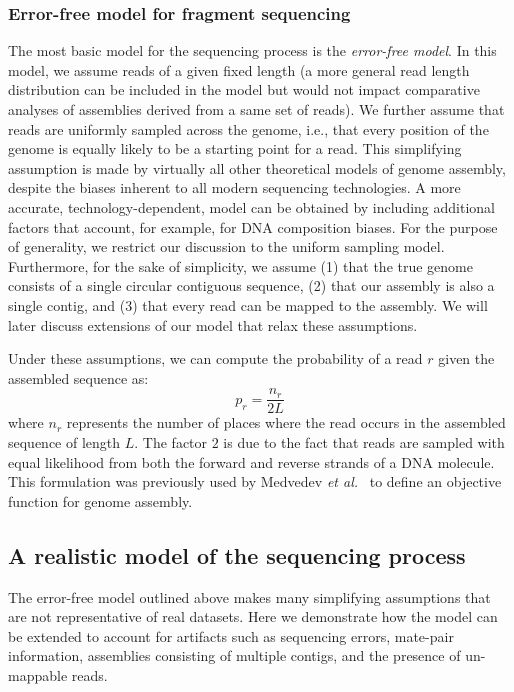 \documentclass[12pt,\mydriver]{thesis}
\begin{document}
\subsubsection{Error-free model for fragment sequencing}
\label{error_free_model}
The most basic model for the sequencing process is the
\emph{error-free model}. In this model, we assume reads of a given
fixed length (a more general read length distribution can be included
in the model but would not impact comparative analyses of assemblies
derived from a same set of reads). We further assume that reads are
uniformly sampled across the genome, i.e., that every position of the
genome is equally likely to be a starting point for a read. This
simplifying assumption is made by virtually all other theoretical
models of genome assembly, despite the biases inherent to all modern
sequencing technologies.  A more accurate, technology-dependent, model
can be obtained by including additional factors that account, for
example, for DNA composition biases.  For the purpose of generality,
we restrict our discussion to the uniform sampling model.
Furthermore, for the sake of simplicity, we assume (1) that the true
genome consists of a single circular contiguous sequence, (2) that our
assembly is also a single contig, and (3) that every read can be
mapped to the assembly.  We will later discuss extensions of our model
that relax these assumptions.

Under these assumptions, we can compute the probability of a
read $r$ given the assembled sequence as:
\begin{equation}
  \label{error_free_probability}
  p_r = \frac{n_r}{2L}
\end{equation}
where $n_r$ represents the number of places where the read occurs in
the assembled sequence of length $L$.  The factor $2$ is due to the
fact that reads are sampled with equal likelihood from both the
forward and reverse strands of a DNA molecule.  This formulation was
previously used by Medvedev \emph{et al.}~\cite{medvedev2009maximum}
to define an objective function for genome assembly.

\subsection{A realistic model of the sequencing process}
The error-free model outlined above makes many simplifying assumptions
that are not representative of real datasets.  Here we demonstrate
how the model can be extended to account for artifacts such as
sequencing errors, mate-pair information, assemblies consisting of
multiple contigs, and the presence of un-mappable reads.
\end{document}

